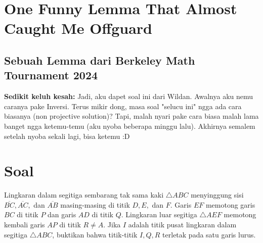 \section*{One Funny Lemma That Almost Caught Me Offguard}
\subsection*{Sebuah Lemma dari Berkeley Math Tournament 2024}
\textbf{Sedikit keluh kesah:} Jadi, aku dapet soal ini dari Wildan. Awalnya aku nemu caranya pake Inversi. Terus mikir dong, masa soal "selucu ini" ngga ada cara biasanya (non projective solution)? Tapi, malah nyari pake cara biasa malah lama banget ngga ketemu-temu (aku nyoba beberapa minggu lalu). Akhirnya semalem setelah nyoba sekali lagi, bisa ketemu :D

\section{Soal}
Lingkaran dalam segitiga sembarang tak sama kaki $\triangle ABC$ menyinggung sisi $\overline{BC}, \overline{AC},$ dan $\overline{AB}$ masing-masing di titik $D, E,$ dan $F$. Garis $EF$ memotong garis $BC$ di titik $P$ dan garis $AD$ di titik $Q$. Lingkaran luar segitiga $\triangle AEF$ memotong kembali garis $AP$ di titik $R \neq A$. Jika $I$ adalah titik pusat lingkaran dalam segitiga $\triangle ABC$, buktikan bahwa titik-titik $I, Q, R$ terletak pada satu garis lurus.

